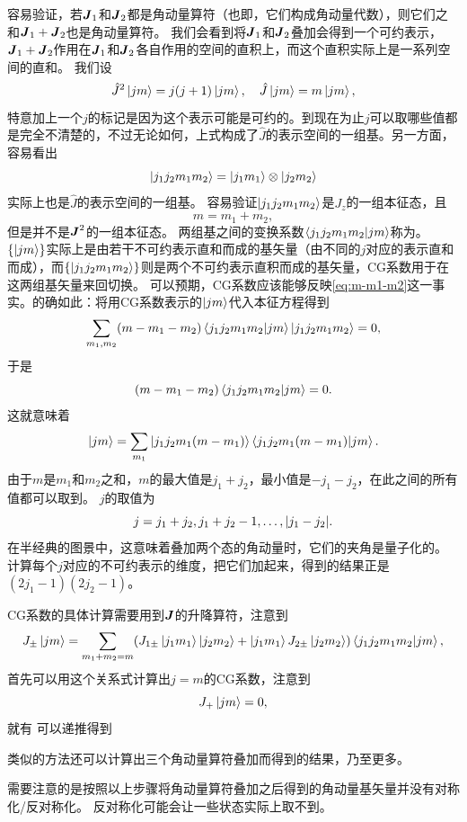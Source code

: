 容易验证，若$\vb*{J}_1$和$\vb*{J}_2$都是角动量算符（也即，它们构成角动量代数），则它们之和$\vb*{J}_1 + \vb*{J}_2$也是角动量算符。
我们会看到将$\vb*{J}_1$和$\vb*{J}_2$叠加会得到一个可约表示，$\vb*{J}_1 + \vb*{J}_2$作用在$\vb*{J}_1$和$\vb*{J}_2$各自作用的空间的直积上，而这个直积实际上是一系列空间的直和。
我们设
\[
    \hat{J}^2 \ket{jm} = j(j+1) \ket{jm}, \quad \hat{J} \ket{jm} = m \ket{jm},
\]
特意加上一个$j$的标记是因为这个表示可能是可约的。到现在为止$j$可以取哪些值都是完全不清楚的，不过无论如何，上式构成了$\hat{J}$的表示空间的一组基。另一方面，容易看出
\[
    \ket{j_1 j_2 m_1 m_2} = \ket{j_1 m_1} \otimes \ket{j_2 m_2}
\]
实际上也是$\hat{J}$的表示空间的一组基。
容易验证$\ket{j_1 j_2 m_1 m_2}$是$J_z$的一组本征态，且
\begin{equation}
    m = m_1 + m_2,
    \label{eq:m-m1-m2}
\end{equation}
但是并不是$\vb*{J}^2$的一组本征态。
两组基之间的变换系数$\braket{j_1 j_2 m_1 m_2}{j m}$称为。
$\{\ket{jm}\}$实际上是由若干不可约表示直和而成的基矢量（由不同的$j$对应的表示直和而成），而$\{\ket{j_1 j_2 m_1 m_2}\}$则是两个不可约表示直积而成的基矢量，CG系数用于在这两组基矢量来回切换。
可以预期，CG系数应该能够反映\eqref{eq:m-m1-m2}这一事实。的确如此：将用CG系数表示的$\ket{jm}$代入本征方程得到
\[
    \sum_{m_1, m_2} (m - m_1 - m_2) \braket{j_1 j_2 m_1 m_2}{j m} \ket{j_1 j_2 m_1 m_2} = 0,
\]
于是
\[
    (m - m_1 - m_2) \braket{j_1 j_2 m_1 m_2}{j m} = 0.
\]
这就意味着
\[
    \ket{jm} = \sum_{m_1} \ket{j_1 j_2 m_1 (m-m_1)} \braket{j_1 j_2 m_1 (m-m_1)}{jm}.
\]
由于$m$是$m_1$和$m_2$之和，$m$的最大值是$j_1+j_2$，最小值是$-j_1-j_2$，在此之间的所有值都可以取到。
$j$的取值为
\[
    j = j_1 + j_2, j_1 + j_2 - 1, \ldots, \abs{j_1 - j_2}.
\]
在半经典的图景中，这意味着叠加两个态的角动量时，它们的夹角是量子化的。
计算每个$j$对应的不可约表示的维度，把它们加起来，得到的结果正是$(2j_1 - 1) (2j_2 - 1)$。

CG系数的具体计算需要用到$\vb*{J}$的升降算符，注意到
\begin{equation}
    J_{\pm} \ket{jm} = \sum_{m_1 + m_2 = m} (J_{1 \pm} \ket{j_1 m_1} \ket{j_2 m_2} + \ket{j_1 m_1} J_{2 \pm} \ket{j_2 m_2}) \braket{j_1 j_2 m_1 m_2}{jm},
    \label{eq:addition-of-ca-opearator-su2}
\end{equation}
首先可以用这个关系式计算出$j=m$的CG系数，注意到
\[
    J_+ \ket{jm} = 0,
\]
就有
可以递推得到

类似的方法还可以计算出三个角动量算符叠加而得到的结果，乃至更多。

需要注意的是按照以上步骤将角动量算符叠加之后得到的角动量基矢量并没有对称化/反对称化。
反对称化可能会让一些状态实际上取不到。

